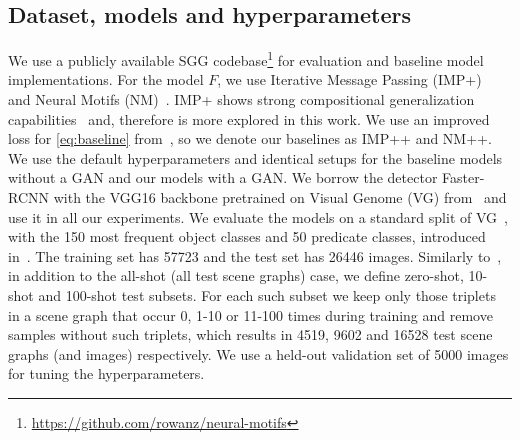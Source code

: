 \subsection{Dataset, models and hyperparameters\label{sec:settins}}
\vspace{-3pt}
We use a publicly available SGG codebase\footnote{\url{https://github.com/rowanz/neural-motifs}} for evaluation and baseline model implementations.
For the model $F$, we use Iterative Message Passing (IMP+)~\citep{xu2017scene, zellers2018neural} and Neural Motifs (NM)~\citep{zellers2018neural}.
IMP+ shows strong compositional generalization capabilities~\citep{knyazev2020graph} and, therefore is more explored in this work.
We use an improved loss for \eqref{eq:baseline} from~\citep{knyazev2020graph}, so we denote our baselines as IMP++ and NM++. %
We use the default hyperparameters and identical setups for the baseline models without a GAN and our models with a GAN. We borrow the detector Faster-RCNN with the VGG16 backbone pretrained on Visual Genome (VG) from~\citep{zellers2018neural} and use it in all our experiments. We evaluate the models on a standard split of VG~\citep{krishna2017visual}, with the 150 most frequent object classes and 50 predicate classes, introduced in~\citep{xu2017scene}. The training set has 57723 and the test set has 26446 images. Similarly to~\citep{knyazev2020graph,wang2019generating,tang2020unbiased,suhail2021energy}, in addition to the all-shot (all test scene graphs) case, we define zero-shot, 10-shot and 100-shot test subsets.
For each such subset we keep only those triplets in a scene graph that occur 0, 1-10 or 11-100 times during training and remove samples without such triplets, which results in 4519, 9602 and 16528 test scene graphs (and images) respectively. 
We use a held-out validation set of 5000 images for tuning the hyperparameters.


